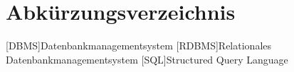 \section*{Abkürzungsverzeichnis}


\begin{acronym}
    [DBMS]{Datenbankmanagementsystem}
    [RDBMS]{Relationales Datenbankmanagementsystem}
    [SQL]{Structured Query Language}
\end{acronym}